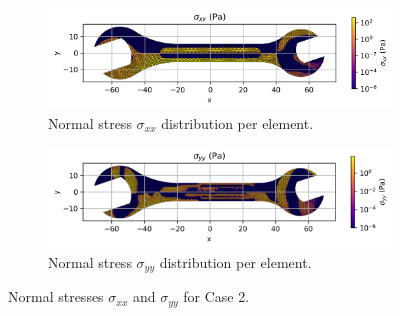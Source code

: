 \begin{figure}[H]
    \centering
    \begin{subfigure}[t]{0.49\textwidth}
      \centering
      \includegraphics[width=\textwidth]{GRAFICOS/Case a - sigma_xx_per_element.png}
      \caption{Normal stress $\sigma_{xx}$ distribution per element.}
      \label{fig:sigma_xx_a}
    \end{subfigure}
    \hfill
    \begin{subfigure}[t]{0.49\textwidth}
      \centering
      \includegraphics[width=\textwidth]{GRAFICOS/Case a - sigma_yy_per_element.png}
      \caption{Normal stress $\sigma_{yy}$ distribution per element.}
      \label{fig:sigma_yy_a}
    \end{subfigure}
    \caption{Normal stresses $\sigma_{xx}$ and $\sigma_{yy}$ for Case 2.}
    \label{fig:normal_stresses_a}
\end{figure}


